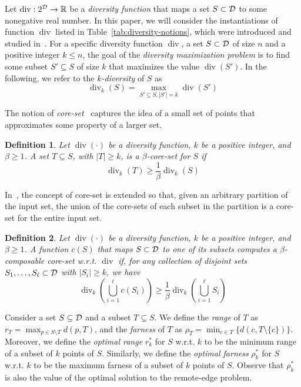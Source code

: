 \documentclass{article}
\newtheorem{definition}{Definition}
\DeclareMathOperator{\diversity}{div}
\begin{document}
Let $\diversity: 2^{\cal D} \rightarrow \mathbb{R}$ be a \emph{diversity
  function} that maps a set $S\subset {\cal D}$ to some nonegative real
number.
In this paper, we will consider the instantiations of function
$\diversity$ listed in Table~\ref{tab:diversity-notions}, which were
introduced and studied in~\cite{ChandraH01,IndykMMM14,AghamolaeiFZ15}.
For a specific diversity function $\diversity$, a set $S\subset
{\cal D}$ of size $n$ and a positive integer $k \leq n$, 
the goal of the \emph{diversity
  maximization problem} is to find some subset $S'\subseteq S$ of size
$k$ that maximizes the value $\diversity(S')$. In the following, we
refer to the \emph{$k$-diversity} of $S$ as
\[
  \diversity_k(S) = \max_{S'\subseteq S, |S'| = k} \diversity( S')
\]

The notion of \emph{core-set}~\cite{AgarwalHV05} captures the idea of
a small set of points that approximates some property of a larger
set.
\begin{definition}\label{def:composable}
Let $\diversity(\cdot)$ be a diversity function, $k$ be a positive
  integer, and $\beta \ge 1$. A set $T\subseteq S$, with $|T| \ge
  k$, is a {\em $\beta$-core-set} for $S$ if
  \[
    \diversity_k(T) \ge \frac{1}{\beta} \diversity_k(S)
  \]
\end{definition}

In~\cite{IndykMMM14, AghamolaeiFZ15}, the concept of core-set is
extended so that, given an arbitrary partition of the input set, the
union of the core-sets of each subset in the partition is a core-set
for the entire input set.
\begin{definition}\label{def:composable-core-set}
  Let $\diversity(\cdot)$ be a diversity function, $k$ be a positive
  integer, and $\beta \ge 1$. A function $c(S)$ that maps
  $S\subset {\cal D}$ to one of its subsets computes a {\em
    $\beta$-composable core-set} w.r.t.  $\diversity$ if, for any
  collection of disjoint sets $S_1,\dots, S_\ell \subset {\cal D}$ with
  $|S_i| \ge k$, we have
  \[
    \diversity_k\left(\bigcup_{i=1}^\ell c(S_i)\right) \ge
    \frac{1}{\beta} \diversity_k\left(\bigcup_{i=1}^\ell S_i\right)
  \]
\end{definition}

Consider a set $S \subseteq {\cal D}$ and a subset $T \subseteq S$. We
define the \emph{range} of $T$ as
$r_T =\max_{p\in S\setminus T} d(p, T)$, and the \emph{farness} of $T$
as $\rho_T= \min_{c\in T}\{d(c, T\setminus \{c\})\}$. Moreover, we
define the \emph{optimal range} $r_k^*$ for $S$ w.r.t. $k$ to be the
minimum range of a subset of $k$ points of $S$. Similarly, we define
the \emph{optimal farness} $\rho_k^*$ for $S$ w.r.t. $k$ to be the
maximum farness of a subset of $k$ points of $S$. Observe that
$\rho_k^*$ is also the value of the optimal solution to the
remote-edge problem.
\end{document}
